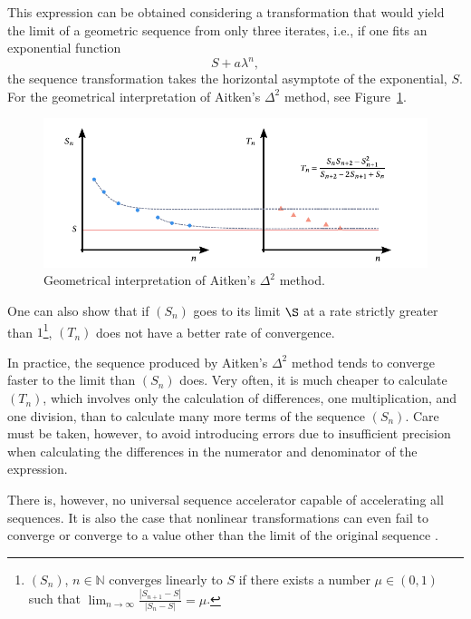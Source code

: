 This expression can be obtained considering a transformation that would yield the limit of a geometric sequence from only three iterates, i.e., if one fits an exponential function
\begin{equation}
  S + a \lambda^n,
\end{equation}
the sequence transformation takes the horizontal asymptote of the exponential, \(S\).
For the geometrical interpretation of Aitken's \(\Delta^2\) method, see Figure~\ref{fig:aitken}.

\begin{figure}[htbp]
  \includegraphics{figures/aitken}
  \caption{Geometrical interpretation of Aitken's \(\Delta^2\) method.}
  \label{fig:aitken}
\end{figure}

One can also show that if \((S_n)\) goes to its limit \(\S\) at a rate strictly greater than \(1\)\footnote{$(S_{n})$, ${n \in \mathbb{N}}$ converges linearly to $S$ if there exists a number $\mu \in(0,1)$ such that \(\lim_{n \rightarrow \infty} \frac{\left|S_{n+1}-S\right|}{\left|S_{n}-S\right|}=\mu\).}, \((T_n)\) does not have a better rate of convergence.

In practice, the sequence produced by Aitken's \(\Delta^2\) method tends to converge faster to the limit than \((S_n)\) does.
Very often, it is much cheaper to calculate \((T_n)\), which involves only the calculation of differences, one multiplication, and one division, than to calculate many more terms of the sequence \((S_n)\).
Care must be taken, however, to avoid introducing errors due to insufficient precision when calculating the differences in the numerator and denominator of the expression.

There is, however, no universal sequence accelerator capable of accelerating all sequences.
It is also the case that nonlinear transformations can even fail to converge or converge to a value other than the limit of the original sequence \citep{brezinski_extrapolation_2013}.

